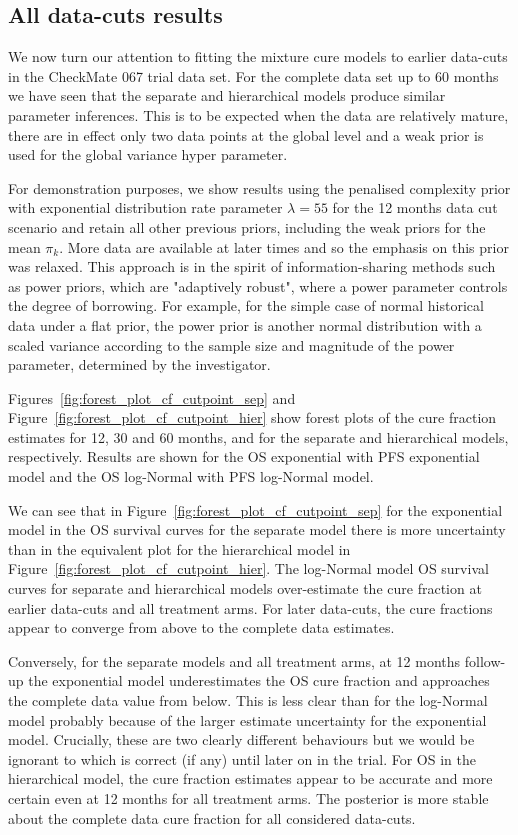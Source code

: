\documentclass[AMA,STIX1COL]{WileyNJD-v2}
\begin{document}
%
\subsection{All data-cuts results}\label{sec:results-data-cut}
We now turn our attention to fitting the mixture cure models to earlier data-cuts in the CheckMate 067 trial data set.
For the complete data set up to 60 months we have seen that the separate and hierarchical models produce similar parameter inferences. This is to be expected when the data are relatively mature, there are in effect only two data points at the global level and a weak prior is used for the global variance hyper parameter.

For demonstration purposes, we show results using the penalised complexity prior with exponential distribution rate parameter $\lambda = 55$ for the 12 months data cut scenario and retain all other previous priors, including the weak priors for the mean $\pi_k$. More data are available at later times and so the emphasis on this prior was relaxed. This approach is in the spirit of information-sharing methods such as power priors, which are "adaptively robust", where a power parameter controls the degree of borrowing. For example, for the simple case of normal historical data under a flat prior, the power prior is another normal distribution with a scaled variance according to the sample size and magnitude of the power parameter, determined by the investigator.

Figures~\ref{fig:forest_plot_cf_cutpoint_sep} and Figure~\ref{fig:forest_plot_cf_cutpoint_hier} show forest plots of the cure fraction estimates for 12, 30 and 60 months, and for the separate and hierarchical models, respectively.
Results are shown for the OS exponential with PFS exponential model and the OS log-Normal with PFS log-Normal model.

We can see that in Figure~\ref{fig:forest_plot_cf_cutpoint_sep} for the exponential model in the OS survival curves for the separate model there is more uncertainty than in the equivalent plot for the hierarchical model in Figure~\ref{fig:forest_plot_cf_cutpoint_hier}.
The log-Normal model OS survival curves for separate and hierarchical models over-estimate the cure fraction at earlier data-cuts and all treatment arms.
For later data-cuts, the cure fractions appear to converge from above to the complete data estimates.

Conversely, for the separate models and all treatment arms, at 12 months follow-up the exponential model underestimates the OS cure fraction and approaches the complete data value from below.
This is less clear than for the log-Normal model probably because of the larger estimate uncertainty for the exponential model.
Crucially, these are two clearly different behaviours but we would be ignorant to which is correct (if any) until later on in the trial.
For OS in the hierarchical model, the cure fraction estimates appear to be accurate and more certain even at 12 months for all treatment arms.
The posterior is more stable about the complete data cure fraction for all considered data-cuts.
\end{document}
